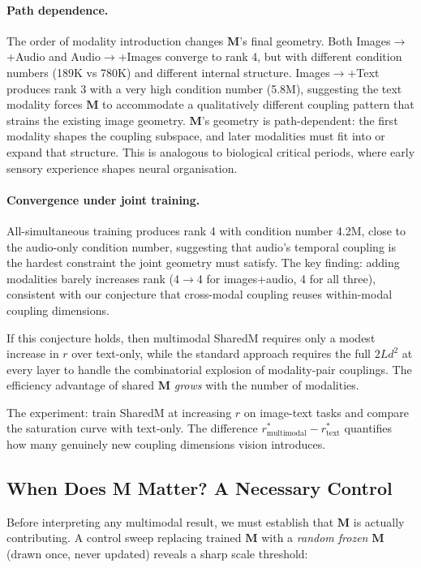 \documentclass[11pt, a4paper]{article}
\newcommand{\M}{\mathbf{M}}
\theoremstyle{plain}
\theoremstyle{remark}
\begin{document}
\paragraph{Path dependence.}
The order of modality introduction changes $\M$'s final geometry.
Both Images$\to$+Audio and Audio$\to$+Images converge to rank 4, but with different condition numbers (189K vs 780K) and different internal structure.
Images$\to$+Text produces rank 3 with a very high condition number (5.8M), suggesting the text modality forces $\M$ to accommodate a qualitatively different coupling pattern that strains the existing image geometry.
$\M$'s geometry is path-dependent: the first modality shapes the coupling subspace, and later modalities must fit into or expand that structure.
This is analogous to biological critical periods, where early sensory experience shapes neural organisation.

\paragraph{Convergence under joint training.}
All-simultaneous training produces rank 4 with condition number 4.2M, close to the audio-only condition number, suggesting that audio's temporal coupling is the hardest constraint the joint geometry must satisfy.
The key finding: adding modalities barely increases rank (4$\to$4 for images+audio, 4 for all three), consistent with our conjecture that cross-modal coupling reuses within-modal coupling dimensions.

If this conjecture holds, then multimodal SharedM requires only a modest increase in $r$ over text-only, while the standard approach requires the full $2Ld^2$ at every layer to handle the combinatorial explosion of modality-pair couplings.
The efficiency advantage of shared $\M$ \emph{grows} with the number of modalities.

The experiment: train SharedM at increasing $r$ on image-text tasks and compare the saturation curve with text-only.
The difference $r^*_{\text{multimodal}} - r^*_{\text{text}}$ quantifies how many genuinely new coupling dimensions vision introduces.

\subsection{When Does M Matter? A Necessary Control}\label{sec:when-m-matters}

Before interpreting any multimodal result, we must establish that $\M$ is actually contributing.
A control sweep replacing trained $\M$ with a \emph{random frozen} $\M$ (drawn once, never updated) reveals a sharp scale threshold:
\end{document}
